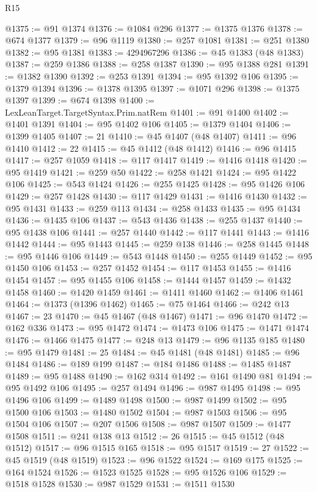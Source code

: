 \begin{lexlean}{R15}
\begin{coremodule}
@1375 := @91 @1374
@1376 := @1084 @296
@1377 := @1375 @1376
@1378 := @674 @1377
@1379 := @96 @1119
@1380 := @257 @1081
@1381 := @251 @1380
@1382 := @95 @1381
@1383 := 4294967296
@1386 := @45 @1383 (@48 @1383)
@1387 := @259 @1386
@1388 := @258 @1387
@1390 := @95 @1388 @281
@1391 := @1382 @1390
@1392 := @253 @1391
@1394 := @95 @1392 @106
@1395 := @1379 @1394
@1396 := @1378 @1395
@1397 := @1071 @296
@1398 := @1375 @1397
@1399 := @674 @1398
@1400 := LexLeanTarget.TargetSyntax.Prim.natRem
@1401 := @91 @1400
@1402 := @1401 @1391
@1404 := @95 @1402 @106
@1405 := @1379 @1404
@1406 := @1399 @1405
@1407 := 21
@1410 := @45 @1407 (@48 @1407)
@1411 := @96 @1410
@1412 := 22
@1415 := @45 @1412 (@48 @1412)
@1416 := @96 @1415
@1417 := @257 @1059
@1418 := @117 @1417
@1419 := @1416 @1418
@1420 := @95 @1419
@1421 := @259 @50
@1422 := @258 @1421
@1424 := @95 @1422 @106
@1425 := @543 @1424
@1426 := @255 @1425
@1428 := @95 @1426 @106
@1429 := @257 @1428
@1430 := @117 @1429
@1431 := @1416 @1430
@1432 := @95 @1431
@1433 := @259 @113
@1434 := @258 @1433
@1435 := @95 @1434
@1436 := @1435 @106
@1437 := @543 @1436
@1438 := @255 @1437
@1440 := @95 @1438 @106
@1441 := @257 @1440
@1442 := @117 @1441
@1443 := @1416 @1442
@1444 := @95 @1443
@1445 := @259 @138
@1446 := @258 @1445
@1448 := @95 @1446 @106
@1449 := @543 @1448
@1450 := @255 @1449
@1452 := @95 @1450 @106
@1453 := @257 @1452
@1454 := @117 @1453
@1455 := @1416 @1454
@1457 := @95 @1455 @106
@1458 := @1444 @1457
@1459 := @1432 @1458
@1460 := @1420 @1459
@1461 := @1411 @1460
@1462 := @1406 @1461
@1464 := @1373 (@1396 @1462)
@1465 := @75 @1464
@1466 := @242 @13
@1467 := 23
@1470 := @45 @1467 (@48 @1467)
@1471 := @96 @1470
@1472 := @162 @336
@1473 := @95 @1472
@1474 := @1473 @106
@1475 := @1471 @1474
@1476 := @1466 @1475
@1477 := @248 @13
@1479 := @96 @1135 @185
@1480 := @95 @1479
@1481 := 25
@1484 := @45 @1481 (@48 @1481)
@1485 := @96 @1484
@1486 := @189 @199
@1487 := @184 @1486
@1488 := @1485 @1487
@1489 := @95 @1488
@1490 := @162 @314
@1492 := @161 @1490 @81
@1494 := @95 @1492 @106
@1495 := @257 @1494
@1496 := @987 @1495
@1498 := @95 @1496 @106
@1499 := @1489 @1498
@1500 := @987 @1499
@1502 := @95 @1500 @106
@1503 := @1480 @1502
@1504 := @987 @1503
@1506 := @95 @1504 @106
@1507 := @207 @1506
@1508 := @987 @1507
@1509 := @1477 @1508
@1511 := @241 @138 @13
@1512 := 26
@1515 := @45 @1512 (@48 @1512)
@1517 := @96 @1515 @165
@1518 := @95 @1517
@1519 := 27
@1522 := @45 @1519 (@48 @1519)
@1523 := @96 @1522
@1524 := @169 @175
@1525 := @164 @1524
@1526 := @1523 @1525
@1528 := @95 @1526 @106
@1529 := @1518 @1528
@1530 := @987 @1529
@1531 := @1511 @1530

\end{coremodule}
\end{lexlean}
